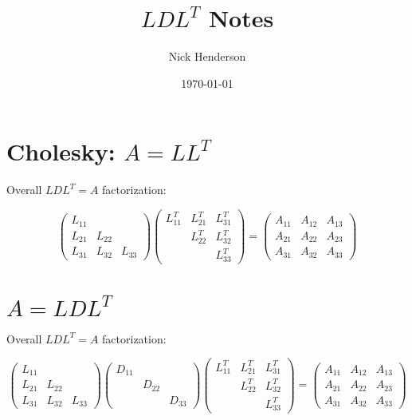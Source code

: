 \documentclass[12pt]{article}
\title{$LDL^T$ Notes}
\author{Nick Henderson}
\date{\today}
\begin{document}
\maketitle

\section{Cholesky: $A=LL^T$}

Overall $LDL^T = A$ factorization:

\begin{equation*}
\begin{pmatrix}
L_{11} &        &        \\
L_{21} & L_{22} &        \\
L_{31} & L_{32} & L_{33}
\end{pmatrix}
\begin{pmatrix}
L_{11}^T & L_{21}^T & L_{31}^T \\
         & L_{22}^T & L_{32}^T \\
         &          & L_{33}^T
\end{pmatrix}
= 
\begin{pmatrix}
A_{11} & A_{12} & A_{13} \\
A_{21} & A_{22} & A_{23} \\
A_{31} & A_{32} & A_{33}
\end{pmatrix}
\end{equation*}

\section{$A=LDL^T$}

Overall $LDL^T = A$ factorization:

\begin{equation*}
\begin{pmatrix}
L_{11} &        &        \\
L_{21} & L_{22} &        \\
L_{31} & L_{32} & L_{33}
\end{pmatrix}
\begin{pmatrix}
D_{11} &        &        \\
       & D_{22} &        \\
       &        & D_{33}
\end{pmatrix}
\begin{pmatrix}
L_{11}^T & L_{21}^T & L_{31}^T \\
         & L_{22}^T & L_{32}^T \\
         &          & L_{33}^T
\end{pmatrix}
= 
\begin{pmatrix}
A_{11} & A_{12} & A_{13} \\
A_{21} & A_{22} & A_{23} \\
A_{31} & A_{32} & A_{33}
\end{pmatrix}
\end{equation*}
\end{document}
